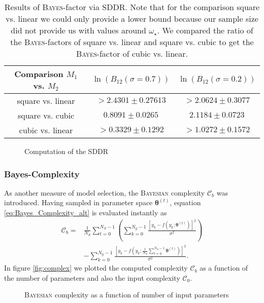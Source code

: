 \documentclass[%
 reprint,
 amsmath,amssymb,
 aps,
]{revtex4-1}
\newcommand{\btheta}{\boldsymbol{\theta}}
\begin{document}
\begin{table}[htbp]
	{\renewcommand{\arraystretch}{1.3}
		\begin{tabular}{|c|c|c|}
			\hline
			Comparison $M_1$ vs. $M_2$ & $\ln(B_{12}(\sigma=0.7))$ & $\ln(B_{12}(\sigma=0.2))$ \\
			\hline
			square vs. linear& $>2.4301\pm0.27613$&$>2.0624\pm0.3077$\\
			square vs. cubic&$0.8091\pm0.0265$  &$2.1184\pm0.0723$\\
			cubic vs. linear & $>0.3329\pm0.1292$&$>1.0272\pm0.1572$\\
			\hline
	\end{tabular}}
	\caption{Results of \textsc{Bayes}-factor via SDDR. Note that for the comparison square vs. linear we could only provide a lower bound because our sample size did not provide us with values around $\omega_\star$. We compared the ratio of the \textsc{Bayes}-factors of square vs. linear and square vs. cubic to get the \textsc{Bayes}-factor of cubic vs. linear.}
	\label{tab:res_sddr}
\end{table}
\begin{figure}[h]
	\centering
	\caption{Computation of the SDDR}
	\label{fig:sddr}
\end{figure}
\subsubsection{\textbf{Bayes-Complexity}}
\noindent As another measure of model selection, the \textsc{Bayesian} complexity $\mathcal{C}_b$ was introduced. Having sampled in parameter space $\btheta^{(t)}$, equation \eqref{eq:Bayes_Complexity_alt} is evaluated instantly as \cite{wuerz} \begin{align*}\mathcal{C}_b=&\frac{1}{N_S}\sum_{t=0}^{N_S-1}\left(\sum_{k=0}^{N_y-1}\frac{[y_k-f(y_k;\btheta^{(t)})]^2}{\sigma^2}\right)\\&-\sum_{k=0}^{N_y-1}\frac{[y_k-f(y_k;\frac{1}{N_S}\sum_{t=0}^{N_S-1}\btheta^{(t)})]^2}{\sigma^2}.\end{align*}
In figure \eqref{fig:complex} we plotted the computed complexity $\mathcal{C}_b$ as a function of the number of parameters and also the input complexity $\mathcal{C}_0$.

\begin{figure}[htbp]
	\centering
	\caption{\textsc{Bayesian} complexity as a function of number of input parameters}
	\label{fig:complex}
\end{figure}
\end{document}
